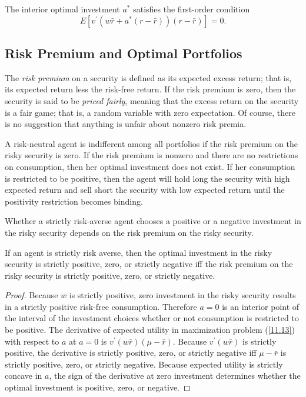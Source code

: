 \documentclass[\topdir/lecture\_notes.tex]{subfiles}
\begin{document}
The interior optimal investment $a^{*}$ satisfies the first-order condition
\begin{equation*}
E\left[v^{\prime}\left(w \bar{r}+a^{*}(r-\bar{r})\right)(r-\bar{r})\right]=0. 
\end{equation*}

\subsection{Risk Premium and Optimal Portfolios}
The \emph{risk premium} on a security is defined as its expected excess return; that is, its expected return less the risk-free return. If the risk premium is zero, then the security is said to be \emph{priced fairly}, meaning that the excess return on the security is a fair game; that is, a random variable with zero expectation. Of course, there is no suggestion that anything is unfair about nonzero risk premia.

A risk-neutral agent is indifferent among all portfolios if the risk premium on the risky security is zero. If the risk premium is nonzero and there are no restrictions on consumption, then her optimal investment does not exist. If her consumption is restricted to be positive, then the agent will hold long the security with high expected return and sell short the security with low expected return until the positivity restriction becomes binding.

Whether a strictly risk-averse agent chooses a positive or a negative investment in the risky security depends on the risk premium on the risky security.
\begin{theorem}\label{thm:risk_premium_investment_direction}
If an agent is strictly risk averse, then the optimal investment in the risky security is strictly positive, zero, or strictly negative iff the risk premium on the risky security is strictly positive, zero, or strictly negative.
\end{theorem}
\begin{proof}
Because $w$ is strictly positive, zero investment in the risky security results in a strictly positive risk-free consumption. Therefore $a=0$ is an interior point of the interval of the investment choices whether or not consumption is restricted to be positive. The derivative of expected utility in maximization problem (\ref{11.13}) with respect to $a$ at $a=0$ is $v^{\prime}(w \bar{r})(\mu-\bar{r})$. Because $v^{\prime}(w \bar{r})$ is strictly positive, the derivative is strictly positive, zero, or strictly negative iff $\mu-\bar{r}$ is strictly positive, zero, or strictly negative. Because expected utility is strictly concave in $a$, the sign of the derivative at zero investment determines whether the optimal investment is positive, zero, or negative.
\end{proof}
\end{document}
